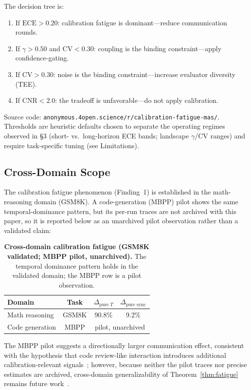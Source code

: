 \documentclass[11pt]{article}
\newcommand{\CV}{\ensuremath{\mathrm{CV}}}
\newcommand{\ECE}{\ensuremath{\mathrm{ECE}}}
\theoremstyle{definition}
\theoremstyle{remark}
\begin{document}
The decision tree is:
\begin{enumerate}[leftmargin=*,nosep]
    \item If $\ECE > 0.20$: calibration fatigue is dominant---reduce communication rounds.
    \item If $\gamma > 0.50$ and $\CV < 0.30$: coupling is the binding constraint---apply confidence-gating.
    \item If $\CV > 0.30$: noise is the binding constraint---increase evaluator diversity (TEE).
    \item If $\text{CNR} < 2.0$: the tradeoff is unfavorable---do not apply calibration.
\end{enumerate}

\noindent Source code: \texttt{anonymous.4open.science/r/calibration-fatigue-mas/}. Thresholds are heuristic defaults chosen to separate the operating regimes observed in \S3 (short- vs.\ long-horizon ECE bands; landscape $\gamma$/$\CV$ ranges) and require task-specific tuning (see Limitations).

\subsection{Cross-Domain Scope}

The calibration fatigue phenomenon (Finding~1) is established in the math-reasoning domain (GSM8K). A code-generation (MBPP) pilot shows the same temporal-dominance pattern, but its per-run traces are not archived with this paper, so it is reported below as an unarchived pilot observation rather than a validated claim:

\begin{table}[H]
\centering
\caption{\textbf{Cross-domain calibration fatigue (GSM8K validated; MBPP pilot, unarchived).} The temporal dominance pattern holds in the validated domain; the MBPP row is a pilot observation.}
\begin{tabular}{@{}lccc@{}}
\toprule
Domain & Task & $\Delta_{\text{pure } T}$ & $\Delta_{\text{pure sync}}$ \\
\midrule
Math reasoning & GSM8K & 90.8\% & 9.2\% \\
Code generation & MBPP & \multicolumn{2}{c}{\footnotesize pilot, unarchived} \\
\bottomrule
\end{tabular}
\end{table}

The MBPP pilot suggests a directionally larger communication effect, consistent with the hypothesis that code review-like interaction introduces additional calibration-relevant signals~\citep{sun2020test}; however, because neither the pilot traces nor precise estimates are archived, cross-domain generalizability of Theorem~\ref{thm:fatigue} remains future work~\citep{temporal2026}.
\end{document}
